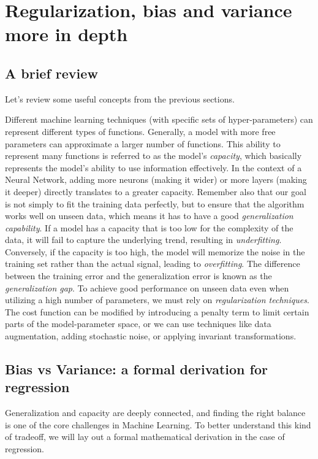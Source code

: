 \section{Regularization, bias and variance more in depth}

\subsection{A brief review}
Let's review some useful concepts from the previous sections. 

Different machine learning techniques (with specific sets of hyper-parameters) can represent different types of functions. Generally, a model with more free parameters can approximate a larger number of functions. This ability to represent many functions is referred to as the model's \textit{capacity}, which basically represents the model's ability to use information effectively. In the context of a Neural Network, adding more neurons (making it wider) or more layers (making it deeper) directly translates to a greater capacity. Remember also that our goal is not simply to fit the training data perfectly, but to ensure that the algorithm works well on unseen data, which means it has to have a good \textit{generalization capability}. If a model has a capacity that is too low for the complexity of the data, it will fail to capture the underlying trend, resulting in \textit{underfitting}. Conversely, if the capacity is too high, the model will memorize the noise in the training set rather than the actual signal, leading to \textit{overfitting}. The difference between the training error and the generalization error is known as the \textit{generalization gap}. To achieve good performance on unseen data even when utilizing a high number of parameters, we must rely on \textit{regularization techniques}. The cost function can be modified by introducing a penalty term to limit certain parts of the model-parameter space, or we can use techniques like data augmentation, adding stochastic noise, or applying invariant transformations.

\subsection{Bias vs Variance: a formal derivation for regression}

Generalization and capacity are deeply connected, and finding the right balance is one of the core challenges in Machine Learning. To better understand this kind of tradeoff, we will lay out a formal mathematical derivation in the case of regression.


